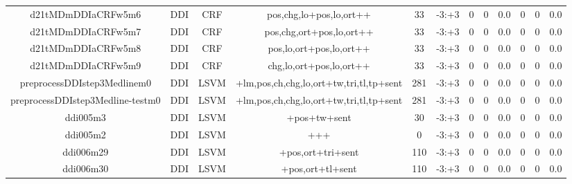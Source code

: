 \documentclass[a4paper]{article}
\begin{document}
\begin{landscape}
\begin{center}
\begin{tabular}{ |c|c|c|c|c|c|c|c|c|c|c|c|}
 
 	
 	\small{ d21tMDmDDIaCRFw5m6 } & \small{ DDI} & \small{  CRF }  & pos,chg,lo+pos,lo,ort++  &  33 &  \small{  -3:+3 }  &  0 & 0 & 0.0  &  0 & 0 & 0.0 \\
 	

 
 	
 	\small{ d21tMDmDDIaCRFw5m7 } & \small{ DDI} & \small{  CRF }  & pos,chg,ort+pos,lo,ort++  &  33 &  \small{  -3:+3 }  &  0 & 0 & 0.0  &  0 & 0 & 0.0 \\
 	

 
 	
 	\small{ d21tMDmDDIaCRFw5m8 } & \small{ DDI} & \small{  CRF }  & pos,lo,ort+pos,lo,ort++  &  33 &  \small{  -3:+3 }  &  0 & 0 & 0.0  &  0 & 0 & 0.0 \\
 	

 
 	
 	\small{ d21tMDmDDIaCRFw5m9 } & \small{ DDI} & \small{  CRF }  & chg,lo,ort+pos,lo,ort++  &  33 &  \small{  -3:+3 }  &  0 & 0 & 0.0  &  0 & 0 & 0.0 \\
 	

 
 	
 	\small{ preprocessDDIstep3Medlinem0 } & \small{ DDI} & \small{  LSVM }  & +lm,pos,ch,chg,lo,ort+tw,tri,tl,tp+sent  &  281 &  \small{  -3:+3 }  &  0 & 0 & 0.0  &  0 & 0 & 0.0 \\
 	

 
 	
 	\small{ preprocessDDIstep3Medline-testm0 } & \small{ DDI} & \small{  LSVM }  & +lm,pos,ch,chg,lo,ort+tw,tri,tl,tp+sent  &  281 &  \small{  -3:+3 }  &  0 & 0 & 0.0  &  0 & 0 & 0.0 \\
 	

 
 	
 	\small{ ddi005m3 } & \small{ DDI} & \small{  LSVM }  & +pos+tw+sent  &  30 &  \small{  -3:+3 }  &  0 & 0 & 0.0  &  0 & 0 & 0.0 \\
 	

 
 	
 	\small{ ddi005m2 } & \small{ DDI} & \small{  LSVM }  & +++  &  0 &  \small{  -3:+3 }  &  0 & 0 & 0.0  &  0 & 0 & 0.0 \\
 	

 
 	
 	\small{ ddi006m29 } & \small{ DDI} & \small{  LSVM }  & +pos,ort+tri+sent  &  110 &  \small{  -3:+3 }  &  0 & 0 & 0.0  &  0 & 0 & 0.0 \\
 	

 
 	
 	\small{ ddi006m30 } & \small{ DDI} & \small{  LSVM }  & +pos,ort+tl+sent  &  110 &  \small{  -3:+3 }  &  0 & 0 & 0.0  &  0 & 0 & 0.0 \\
 	


\end{tabular}
\end{center}
\end{landscape}
\end{document}
